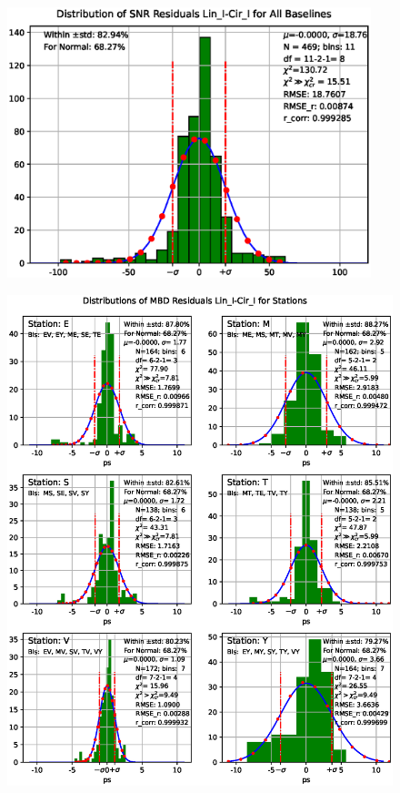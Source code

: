 \documentclass[letterpaper,twoside,12pt]{article}
\begin{document}
\begin{figure}[ht!]
  \begin{center}
  \includegraphics[width=25pc]{Distr_SNR_Lin_I-Cir_I_Diff.eps}
  \caption{\small }
  \label{dsnr_distr}
  \end{center}
\end{figure}



\begin{figure}[ht!]
  \begin{center}
  \includegraphics[width=33pc]{Distr_MBD_Lin_I-Cir_I_Diff_Stations.eps}
  \caption{\small }
  \label{dmbd_distr_st}
  \end{center}
\end{figure}
\end{document}
